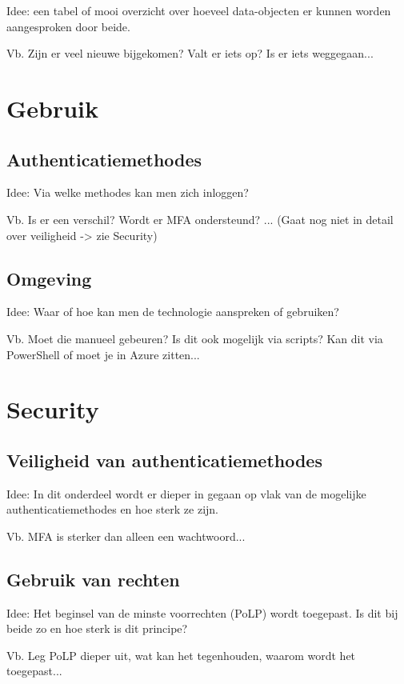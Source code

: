 Idee: een tabel of mooi overzicht over hoeveel data-objecten er kunnen worden aangesproken door beide.

Vb. Zijn er veel nieuwe bijgekomen? Valt er iets op? Is er iets weggegaan...



\section{Gebruik}

\subsection{Authenticatiemethodes}

Idee: Via welke methodes kan men zich inloggen? 

Vb. Is er een verschil? Wordt er MFA ondersteund? ... (Gaat nog niet in detail over veiligheid -> zie Security)

\subsection{Omgeving}

Idee: Waar of hoe kan men de technologie aanspreken of gebruiken?

Vb. Moet die manueel gebeuren? Is dit ook mogelijk via scripts? Kan dit via PowerShell of moet je in Azure zitten...


\section{Security}

\subsection{Veiligheid van authenticatiemethodes}

Idee: In dit onderdeel wordt er dieper in gegaan op vlak van de mogelijke authenticatiemethodes en hoe sterk ze zijn.

Vb. MFA is sterker dan alleen een wachtwoord...

\subsection{Gebruik van rechten}

Idee: Het beginsel van de minste voorrechten (PoLP) wordt toegepast. Is dit bij beide zo en hoe sterk is dit principe?

Vb. Leg PoLP dieper uit, wat kan het tegenhouden, waarom wordt het toegepast...

